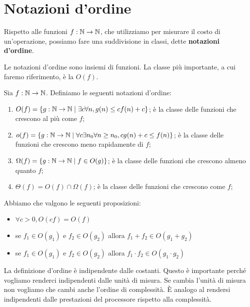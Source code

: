 \section{Notazioni d'ordine}

Rispetto alle funzioni $f:\mathbb{N} \to \mathbb{N}$, che utilizziamo per misurare il costo di un'operazione,
possiamo fare una suddivisione in classi, dette \textbf{notazioni d'ordine}.

Le notazioni d'ordine sono insiemi di funzioni. La classe più importante, a cui faremo riferimento,
è la $O(f)$.

\begin{defn}
    Sia $f: \mathbb{N} \to \mathbb{N}$. Definiamo le seguenti notazioni d'ordine:
    \begin{enumerate}
        \item $O(f) = \left\{g:\mathbb{N} \to \mathbb{N} \mid \exists c \forall n, g(n) \leq c f(n) + c\right\}$; è la
        classe delle funzioni che crescono al più come $f$;
        \item $o(f) = \left\{g:\mathbb{N} \to \mathbb{N} \mid \forall c \exists n_{0} \forall n \geq n_{0}, c g(n)
        + c \leq f(n)\right\}$; è la classe delle funzioni che crescono meno rapidamente di $f$;
        \item $\Omega(f) = \left\{g:\mathbb{N} \to \mathbb{N} \mid f \in O(g)\right\}$; è la classe delle funzioni che
        crescono almeno quanto $f$;
        \item $\Theta(f) = O(f) \cap \Omega(f)$; è la classe delle funzioni che crescono come $f$;
    \end{enumerate}
\end{defn}

Abbiamo che valgono le seguenti proposizioni:
\begin{itemize}
    \item $\forall c > 0, O(cf) = O(f)$ 
    \item se $f_{1} \in O(g_{1})$ e $f_{2} \in O(g_{2})$ allora $f_{1} + f_{2} \in O(g_{1} + g_{2})$
    \item se $f_{1} \in O(g_{1})$ e $f_{2} \in O(g_{2})$ allora $f_{1}\cdot f_{2} \in O(g_{1} \cdot g_{2})$
\end{itemize}

La definizione d'ordine è indipendente dalle costanti. Questo è importante perché vogliamo
renderci indipendenti dalle unità di misura. Se cambia l'unità di misura non vogliamo che cambi
anche l'ordine di complessità. È analogo al rendersi indipendenti dalle prestazioni del processore
rispetto alla complessità.

